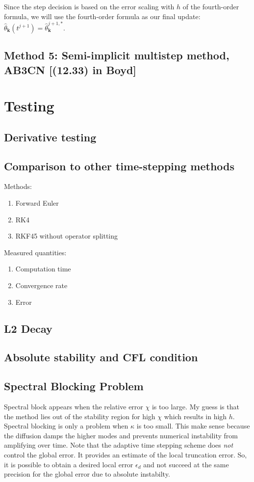 \documentclass[12pt]{article}
\begin{document}
Since the step decision is based on the error scaling with $h$ of the fourth-order formula, we will use the fourth-order formula as our final update: $\hat{\theta}_{\mathbf{k}}(t^{j+1})=\hat{\theta}_{\mathbf{k}}^{j+1,*}$.

\subsection{Method 5: Semi-implicit multistep method, AB3CN [(12.33) in Boyd] }

\section{Testing}

\subsection{Derivative testing}

\subsection{Comparison to other time-stepping methods}
Methods:
\begin{enumerate}
\item  Forward Euler
\item RK4 
\item RKF45 without operator splitting
\end{enumerate}
Measured quantities:
\begin{enumerate}
\item Computation time
\item Convergence rate
\item Error
\end{enumerate}

\subsection{L2 Decay}
\subsection{Absolute stability and CFL condition}

\subsection{Spectral Blocking Problem}

Spectral block appears when the relative error $\chi$ is too large. My guess is that the method lies out of the stability region for high $\chi$ which results in high $h$. Spectral blocking is only a problem when $\kappa$ is too small. This make sense because the diffusion damps the higher modes and prevents numerical instability from amplifying over time. Note that the adaptive time stepping scheme does {\it not } control the global error. It provides an estimate of the local truncation error. So, it is possible to obtain a desired local error $\epsilon_{d}$ and not succeed at the same precision for the global error due to absolute instabilty. 
\end{document}
